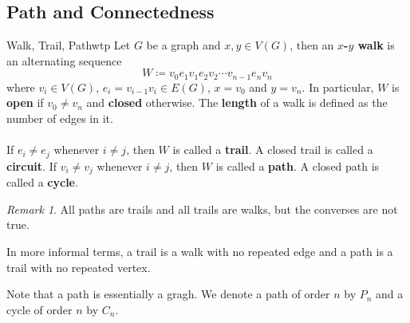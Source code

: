 \documentclass[math]{amznotes}
\theoremstyle{remark}
\newtheorem*{remark}{Remark}
\begin{document}
\subsection{Path and Connectedness}
\begin{dfnbox}{Walk, Trail, Path}{wtp}
    Let $G$ be a graph and $x, y \in V(G)$, then an {\color{red} \textbf{$x$-$y$ walk}} is an alternating sequence
    \begin{equation*}
        W \coloneqq v_0e_1v_1e_2v_2\cdots v_{n - 1}e_nv_n
    \end{equation*}
    where $v_i \in V(G)$, $e_i = v_{i - 1}v_i \in E(G)$, $x = v_0$ and $y = v_n$. In particular, $W$ is {\color{red} \textbf{open}} if $v_0 \neq v_n$ and {\color{red} \textbf{closed}} otherwise. The {\color{red} \textbf{length}} of a walk is defined as the number of edges in it.
    \\\\
    If $e_i \neq e_j$ whenever $i \neq j$, then $W$ is called a {\color{red} \textbf{trail}}. A closed trail is called a {\color{red} \textbf{circuit}}. If $v_i \neq v_j$ whenever $i \neq j$, then $W$ is called a {\color{red} \textbf{path}}. A closed path is called a {\color{red} \textbf{cycle}}.
\end{dfnbox}
\begin{notebox}
    \begin{remark}
        All paths are trails and all trails are walks, but the converses are not true.
    \end{remark}
\end{notebox}
In more informal terms, a trail is a walk with no repeated edge and a path is a trail with no repeated vertex.

Note that a path is essentially a gragh. We denote a path of order $n$ by $P_n$ and a cycle of order $n$ by $C_n$.
\end{document}
